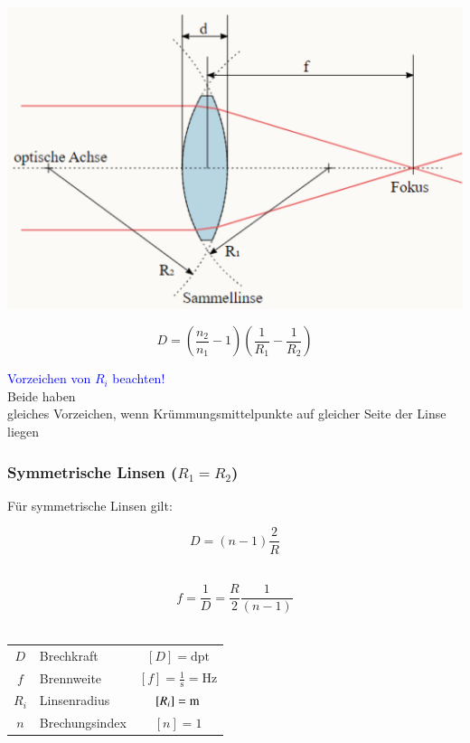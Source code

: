 \begin{minipage}{0.52\linewidth}
\includegraphics[width=\linewidth]{Bilder/Wellen-Optik/Linsenschleifergleichung}
\end{minipage}
\hfill
\begin{minipage}{0.46\linewidth}
$$\boxed{D = \left(\frac{n_2}{n_1}-1\right) \left(  \frac{1}{R_1} - \frac{1}{R_2} \right)  }$$

\textcolor{blue}{Vorzeichen von $R_i$ beachten!} \\
Beide haben \\
gleiches Vorzeichen, wenn Krümmungsmittelpunkte auf gleicher Seite der Linse liegen
\end{minipage}



\subsubsection{Symmetrische Linsen ($R_1 = R_2$)}

Für symmetrische Linsen gilt:

\begin{minipage}{0.48\linewidth}
$$\boxed{D = (n - 1)\frac{2}{R}}$$ \\
\end{minipage}
\hfill
\begin{minipage}{0.48\linewidth}
$$\boxed{f = \frac{1}{D} = \frac{R}{2}\frac{1}{(n - 1)}} $$ \\
\end{minipage}



\begin{tabular}{c l c}
	$D$ & Brechkraft & $[D] = \mathrm{dpt}$ \\
	$f$ & Brennweite & $[f] = \mathrm{\frac{1}{s} = Hz}$ \\
	$R_i$ & Linsenradius & $[R_i] = \mathrm{m}$ \\
	$n$ & Brechungsindex & $[n] = 1$ \\
\end{tabular}


